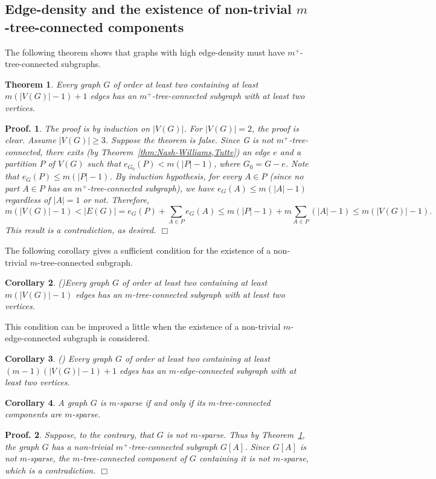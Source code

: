 \documentclass[10pt,bezier]{article}
\newtheorem{prethm}{{\bf Theorem}}[section]
\newenvironment{thm}{\begin{prethm}{\hspace{-0.5
em}{\bf.}}}{\end{prethm}}
\newtheorem{precor}[prethm]{{\bf Corollary}}
\newenvironment{cor}{\begin{precor}{\hspace{-0.5
em}{\bf.}}}{\end{precor}}
\newtheorem{preproof}{{\bf Proof.}}
\newenvironment{proof}[1]{\begin{preproof}{\rm
#1}\hfill{$\Box$}}{\end{preproof}}
\begin{document}
\subsection{Edge-density and the existence of non-trivial $m$-tree-connected components}
%
The following theorem shows that graphs with high edge-density must have $m^+$-tree-connected subgraphs.
\begin{thm}\label{thm:m+-subgraph}
{Every graph $G$ of order at least two containing at least $m(|V(G)|-1)+1$ edges has an
$m^+$-tree-connected subgraph with at least two vertices.
}\end{thm}
%
\begin{proof}
{The proof is by induction on $|V(G)|$. 
For $|V(G)|=2$, the proof is clear.
Assume $|V(G)|\ge 3$. Suppose the theorem is false. 
Since G is not $m^+$-tree-connected, there exits (by Theorem~\ref{thm:Nash-Williams,Tutte})
 an edge $e$ and a partition $P$ of $V(G)$ such that
 $e_{G_0}(P)< m(|P|-1)$, where $G_0=G-e$. Note that $e_{G}(P)\le m(|P|-1)$.
By induction hypothesis, for every $A\in P$ (since no part $A\in P$ has an $m^+$-tree-connected subgraph), 
we have $e_{G}(A)\le m(|A|-1)$ regardless of $|A|=1$ or not. 
Therefore, 
$$ m(|V(G)|-1) < |E(G)|= e_G(P)+\sum_{A\in P}e_G(A)\le m(|P|-1)+m \sum_{A\in P}(|A|-1)\le m(|V(G)|-1).$$
This result is a contradiction, as desired.
}\end{proof}
%
%
The following corollary 
 gives a sufficient condition for the existence of a non-trivial $m$-tree-connected subgraph.
\begin{cor}{\rm (\cite{Yao-Li-Lai-2010})}\label{lem:non-trivial-component}
{Every graph $G$ of order at least two containing at least $m(|V(G)|-1)$ edges has an
$m$-tree-connected subgraph with at least two vertices.
}\end{cor}
This condition can be improved a little when the existence of a non-trivial $m$-edge-connected subgraph is considered.
\begin{cor}{\rm (\cite[Section 2]{Thomassen-2013-fixedlength})}
{Every graph $G$ of order at least two containing at least $(m-1)(|V(G)|-1)+1$ edges has an
$m$-edge-connected subgraph with at least two vertices.
}\end{cor}
%
\begin{cor}\label{cor:spare-component}
{A graph $G$ is $m$-sparse if and only if its $m$-tree-connected components are $m$-sparse.
}\end{cor}
%
\begin{proof}
{Suppose, to the contrary, that $G$ is not $m$-sparse. Thus
 by Theorem~\ref{thm:m+-subgraph}, the graph $G$ has a non-trivial $m^+$-tree-connected subgraph $G[A]$.
Since $G[A]$ is not $m$-sparse, the $m$-tree-connected component of $G$ containing it is not $m$-sparse, which is a contradiction.
}\end{proof}
\end{document}
